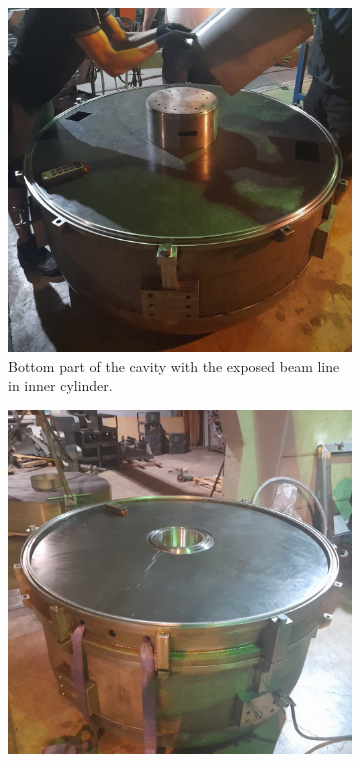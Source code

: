 \documentclass{book}
\begin{document}
\iffalse \begin{figure}
    \centering
    \begin{subfigure}{.5\textwidth}
      \centering
      \includegraphics[width=.96\linewidth]{../../../figures/manif/toroidal_sheets/rhodo_bottom_cropped.jpeg}
      \caption{Bottom part of the cavity with the exposed beam line in inner cylinder.}
    \end{subfigure}%
    \centering
    \begin{subfigure}{.5\textwidth}
      \centering
      \includegraphics[width=.96\linewidth]{../../../figures/manif/toroidal_sheets/rhodo_middle_toroidal_sheets_welded_cropped.jpeg}

\end{subfigure}
\end{figure}
\end{document}
